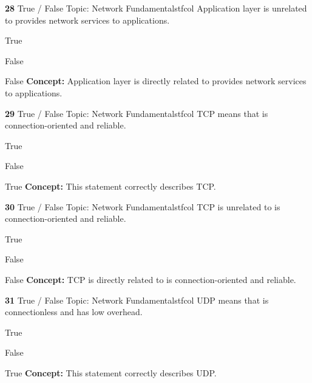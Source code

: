 \documentclass[10pt,a4paper]{article}
\begin{document}
\begin{qcard}{\color{white}\textbf{28} \hfill \small True / False \textbar{} Topic: Network Fundamentals}{tfcol}
Application layer is unrelated to provides network services to applications.

\begin{qoptions}
\item True
\item False
\end{qoptions}
\begin{explainbox}{False}
\textbf{Concept:} Application layer is directly related to provides network services to applications.
\end{explainbox}
\end{qcard}

\begin{qcard}{\color{white}\textbf{29} \hfill \small True / False \textbar{} Topic: Network Fundamentals}{tfcol}
TCP means that is connection-oriented and reliable.

\begin{qoptions}
\item True
\item False
\end{qoptions}
\begin{explainbox}{True}
\textbf{Concept:} This statement correctly describes TCP.
\end{explainbox}
\end{qcard}

\begin{qcard}{\color{white}\textbf{30} \hfill \small True / False \textbar{} Topic: Network Fundamentals}{tfcol}
TCP is unrelated to is connection-oriented and reliable.

\begin{qoptions}
\item True
\item False
\end{qoptions}
\begin{explainbox}{False}
\textbf{Concept:} TCP is directly related to is connection-oriented and reliable.
\end{explainbox}
\end{qcard}

\begin{qcard}{\color{white}\textbf{31} \hfill \small True / False \textbar{} Topic: Network Fundamentals}{tfcol}
UDP means that is connectionless and has low overhead.

\begin{qoptions}
\item True
\item False
\end{qoptions}
\begin{explainbox}{True}
\textbf{Concept:} This statement correctly describes UDP.
\end{explainbox}
\end{qcard}
\end{document}
